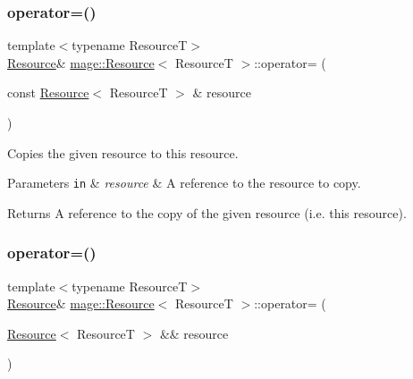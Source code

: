 \subsubsection{\texorpdfstring{operator=()}{operator=()}\hspace{0.1cm}{\footnotesize\ttfamily [1/2]}}
{\footnotesize\ttfamily template$<$typename ResourceT$>$ \\
\mbox{\hyperlink{classmage_1_1_resource}{Resource}}\& \mbox{\hyperlink{classmage_1_1_resource}{mage\+::\+Resource}}$<$ ResourceT $>$\+::operator= (\begin{DoxyParamCaption}\item[{const \mbox{\hyperlink{classmage_1_1_resource}{Resource}}$<$ ResourceT $>$ \&}]{resource }\end{DoxyParamCaption})\hspace{0.3cm}{\ttfamily [delete]}}

Copies the given resource to this resource.


\begin{DoxyParams}[1]{Parameters}
\mbox{\tt in}  & {\em resource} & A reference to the resource to copy. \\
\hline
\end{DoxyParams}
\begin{DoxyReturn}{Returns}
A reference to the copy of the given resource (i.\+e. this resource). 
\end{DoxyReturn}
\mbox{\label{classmage_1_1_resource_aa1f7a7ddd31f4fc16293b4a5ca9a93c8}} 
\subsubsection{\texorpdfstring{operator=()}{operator=()}\hspace{0.1cm}{\footnotesize\ttfamily [2/2]}}
{\footnotesize\ttfamily template$<$typename ResourceT$>$ \\
\mbox{\hyperlink{classmage_1_1_resource}{Resource}}\& \mbox{\hyperlink{classmage_1_1_resource}{mage\+::\+Resource}}$<$ ResourceT $>$\+::operator= (\begin{DoxyParamCaption}\item[{\mbox{\hyperlink{classmage_1_1_resource}{Resource}}$<$ ResourceT $>$ \&\&}]{resource }\end{DoxyParamCaption})\hspace{0.3cm}{\ttfamily [noexcept]}}

